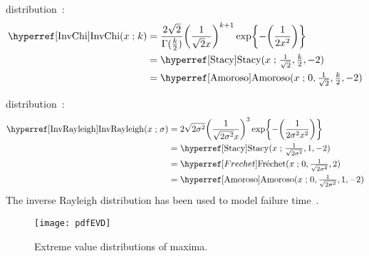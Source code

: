  distribution~\cite{Lee2012}: 
\begin{align}
\label{InvChi}
\opr{InvChi}(x \given k) 
&= \frac{2\sqrt{2} }{ \Gamma(\tfrac{k}{2})} { \Left(\frac{1}{\sqrt{2} x}\Right)}^{k+1} \exp\Left\{-\Left(\frac{1}{2 x^2}  \Right)\Right\}
\checked
\\
&=  \opr{Stacy}(x\given  \tfrac{1}{\sqrt{2}}, \tfrac{k}{2}, -2)  \notag \checked \\
&=  \opr{Amoroso}(x\given  0, \tfrac{1}{\sqrt{2}} , \tfrac{k}{2}, -2) \notag  \checked
\end{align}


 distribution~\cite{Evans2000}:
\begin{align}
\label{InvRayleigh}
\opr{InvRayleigh}(x \given \sigma) 
&= 2 \sqrt{2 \sigma ^2}    \Left(\frac{1}{\sqrt{2 \sigma^2} x}\Right)^{3} \exp\Left\{-\Left(\frac{1}{2 \sigma^2 x^2}  \Right)\Right\}
\checked
\\
&=  \opr{Stacy}(x\given \tfrac{1}{\sqrt{2 \sigma^2}}, 1, -2)  \notag \checked \\
& = \Frechet(x\given 0, \tfrac{1}{\sqrt{2 \sigma^2}}, 2)\notag \\
&=  \opr{Amoroso}(x\given  0, \tfrac{1}{\sqrt{2 \sigma^2}}, 1, -2)  \checked \notag 
\end{align}
The inverse Rayleigh distribution has been used to model  failure time~\cite{Voda1972}.





\label{SecExtremeOrderStatistic}


\begin{figure}[t]
\begin{center}
\texttt{[image: pdfEVD]}
\end{center}
\caption{Extreme value distributions of maxima.}
\end{figure}



